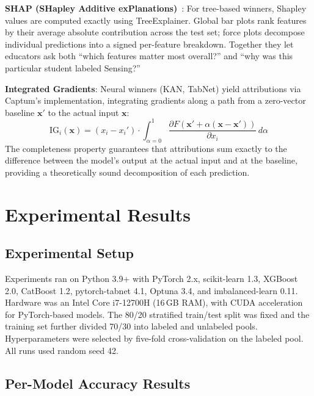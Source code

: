 \documentclass[journal, onecolumn]{IEEEtran}
\begin{document}
\textbf{SHAP (SHapley Additive exPlanations)}~\cite{lundberg2017shap}: For tree-based winners, Shapley values are computed exactly using TreeExplainer. Global bar plots rank features by their average absolute contribution across the test set; force plots decompose individual predictions into a signed per-feature breakdown. Together they let educators ask both ``which features matter most overall?'' and ``why was this particular student labeled Sensing?''

\textbf{Integrated Gradients}: Neural winners (KAN, TabNet) yield attributions via Captum's implementation, integrating gradients along a path from a zero-vector baseline $\mathbf{x}'$ to the actual input $\mathbf{x}$:
\begin{equation}
    \text{IG}_i(\mathbf{x}) = (x_i - x_i') \cdot \int_{\alpha=0}^{1} \frac{\partial F(\mathbf{x}' + \alpha(\mathbf{x} - \mathbf{x}'))}{\partial x_i} \, d\alpha
\end{equation}
The completeness property guarantees that attributions sum exactly to the difference between the model's output at the actual input and at the baseline, providing a theoretically sound decomposition of each prediction.

\section{Experimental Results}

\subsection{Experimental Setup}

Experiments ran on Python 3.9+ with PyTorch 2.x, scikit-learn 1.3, XGBoost 2.0, CatBoost 1.2, pytorch-tabnet 4.1, Optuna 3.4, and imbalanced-learn 0.11. Hardware was an Intel Core i7-12700H (16\,GB RAM), with CUDA acceleration for PyTorch-based models. The 80/20 stratified train/test split was fixed and the training set further divided 70/30 into labeled and unlabeled pools. Hyperparameters were selected by five-fold cross-validation on the labeled pool. All runs used random seed 42.

\subsection{Per-Model Accuracy Results}
\end{document}
